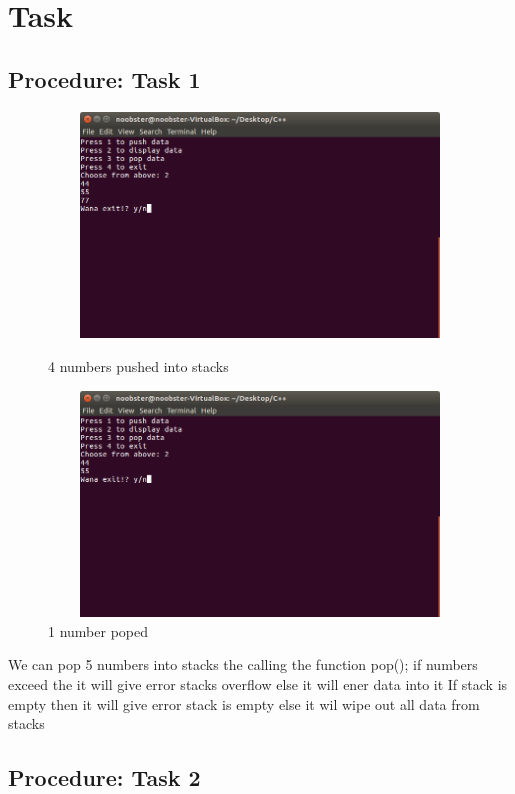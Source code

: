 \documentclass[11pt]{article}            %
\begin{document}
\section{Task}  
\subsection{Procedure: Task 1 }     

\begin{figure}
\centering
  \includegraphics[width=12cm,height=6cm,keepaspectratio]{3.png}
\caption{4 numbers pushed into stacks}
\label{Figure:1}    
  \includegraphics[width=12cm,height=6cm,keepaspectratio]{5.png}
\caption{1 number poped}
\label{Figure:2}   
\end{figure}
We can pop  5 numbers into stacks the calling the function pop(); if numbers exceed the it will give error stacks overflow else it will ener data into it
If stack is empty then it will give error stack is empty else it wil wipe out all data from stacks

\subsection{Procedure: Task 2 }     
\end{document}
